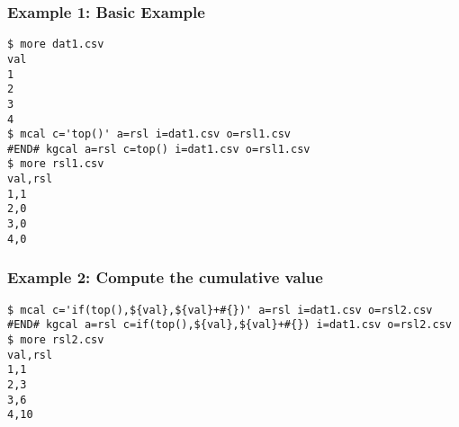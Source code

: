 \subsubsection*{Example 1: Basic Example}



\begin{Verbatim}[baselinestretch=0.7,frame=single]
$ more dat1.csv
val
1
2
3
4
$ mcal c='top()' a=rsl i=dat1.csv o=rsl1.csv
#END# kgcal a=rsl c=top() i=dat1.csv o=rsl1.csv
$ more rsl1.csv
val,rsl
1,1
2,0
3,0
4,0
\end{Verbatim}
\subsubsection*{Example 2: Compute the cumulative value}



\begin{Verbatim}[baselinestretch=0.7,frame=single]
$ mcal c='if(top(),${val},${val}+#{})' a=rsl i=dat1.csv o=rsl2.csv
#END# kgcal a=rsl c=if(top(),${val},${val}+#{}) i=dat1.csv o=rsl2.csv
$ more rsl2.csv
val,rsl
1,1
2,3
3,6
4,10
\end{Verbatim}
